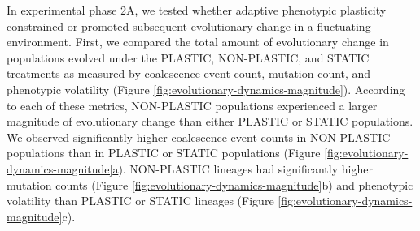 % 
% 
% 
% 

In experimental phase 2A,
we tested whether adaptive phenotypic plasticity constrained or promoted subsequent evolutionary change in a fluctuating environment. 
First, we compared the total amount of evolutionary change in populations evolved under the PLASTIC, NON-PLASTIC, and STATIC treatments as measured by coalescence event count, mutation count, and phenotypic volatility (Figure \ref{fig:evolutionary-dynamics-magnitude}).
According to each of these metrics, NON-PLASTIC populations experienced a larger magnitude of evolutionary change than either PLASTIC or STATIC populations.
We observed significantly higher coalescence event counts in NON-PLASTIC populations than in PLASTIC or STATIC populations (Figure \ref{fig:evolutionary-dynamics-magnitude}\hyperref[fig:evolutionary-dynamics-magnitude]{a}).
NON-PLASTIC lineages had significantly higher mutation counts (Figure \ref{fig:evolutionary-dynamics-magnitude}b) and phenotypic volatility than PLASTIC or STATIC lineages (Figure \ref{fig:evolutionary-dynamics-magnitude}c).

